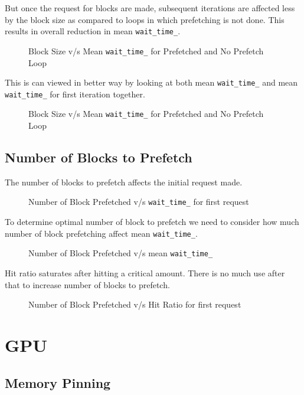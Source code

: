 But once the request for blocks are made, subsequent iterations are affected less
by the block size as compared to loops in which prefetching is not done. This results
in overall reduction in mean \texttt{wait\_time\_}.
\begin{figure}[h]
  
  \caption{Block Size v/s Mean \texttt{wait\_time\_} for Prefetched and No Prefetch Loop}
\end{figure}

This is can viewed in better way by looking at both mean \texttt{wait\_time\_} and
mean \texttt{wait\_time\_} for first iteration together.
\begin{figure}[h]
  
  \caption{Block Size v/s Mean \texttt{wait\_time\_} for Prefetched and No Prefetch Loop}
\end{figure}

\subsection{Number of Blocks to Prefetch}
The number of blocks to prefetch affects the initial request made.
\begin{figure}[h]
  
  \caption{Number of Block Prefetched v/s \texttt{wait\_time\_} for first request}
\end{figure}

To determine optimal number of block to prefetch we need to consider how much
number of block prefetching affect mean \texttt{wait\_time\_}.
\begin{figure}[h]
  
  \caption{Number of Block Prefetched v/s mean \texttt{wait\_time\_}}
\end{figure}

Hit ratio saturates after hitting a critical amount. There is no much use after
that to increase number of blocks to prefetch.
\begin{figure}[h]
  
  \caption{Number of Block Prefetched v/s Hit Ratio for first request}
\end{figure}

\section{GPU}
\subsection{Memory Pinning}
